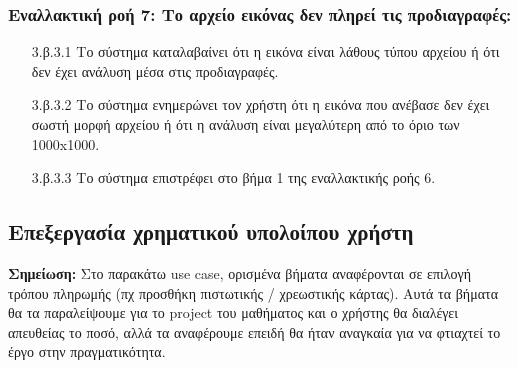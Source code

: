 \documentclass[12pt,a4paper]{article}
\begin{document}
\subsubsection*{Εναλλακτική ροή 7: Το αρχείο εικόνας δεν πληρεί τις προδιαγραφές:}
\begin{enumerate}
    \item [3.β.3.1] Το σύστημα καταλαβαίνει ότι η εικόνα είναι λάθους τύπου αρχείου ή ότι δεν έχει ανάλυση μέσα στις προδιαγραφές.
    \item [3.β.3.2] Το σύστημα ενημερώνει τον χρήστη ότι η εικόνα που ανέβασε δεν έχει σωστή μορφή αρχείου ή ότι η ανάλυση είναι μεγαλύτερη από το όριο των 1000x1000.
    \item [3.β.3.3] Το σύστημα επιστρέφει στο βήμα 1 της εναλλακτικής ροής 6.
\end{enumerate}

\subsection{Επεξεργασία χρηματικού υπολοίπου χρήστη}

\textbf{Σημείωση: } Στο παρακάτω use case, ορισμένα βήματα αναφέρονται σε επιλογή τρόπου πληρωμής (πχ προσθήκη πιστωτικής / χρεωστικής κάρτας). Αυτά τα βήματα θα τα παραλείψουμε για το project του μαθήματος και ο χρήστης θα διαλέγει απευθείας το ποσό, αλλά τα αναφέρουμε επειδή θα ήταν αναγκαία για να φτιαχτεί το έργο στην πραγματικότητα.
\end{document}
